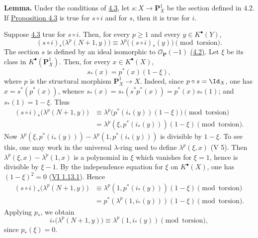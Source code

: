 \textbf{Lemma.} Under the conditions of \hyperlink{sga6.e07.thm.4-3}{4.3}, let \(s:X\to\mathbf P_X^1\) be the section defined in 4.2. If \hyperlink{sga6.e07.thm.4-3}{Proposition 4.3} is true for \(s\circ i\) and for \(s\), then it is true for \(i\).

Suppose \hyperlink{sga6.e07.thm.4-3}{4.3} true for \(s\circ i\). Then, for every \(p\ge1\) and every \(y\in K^\bullet(Y)\),
\begin{equation}\tag{4.3.3}
 (s\circ i)_*\bigl(\lambda^p(N+1,y)\bigr)
 \equiv
 \lambda^p\bigl((s\circ i)_*(y)\bigr)
 \pmod{\text{torsion}}.
\end{equation}
The section \(s\) is defined by an ideal isomorphic to \(\mathcal O_{\mathbf P}(-1)\) \hyperlink{sga6.e07.sec.4.2}{(4.2)}. Let \(\xi\) be its class in \(K^\bullet(\mathbf P_X^1)\). Then, for every \(x\in K^\bullet(X)\),
\[
  s_*(x)=p^*(x)(1-\xi),
\]
where \(p\) is the structural morphism \(\mathbf P_X^1\to X\). Indeed, since \(p\circ s=\Id_X\), one has \(x=s^*(p^*(x))\), whence \(s_*(x)=s_*(s^*p^*(x))=p^*(x)s_*(1)\); and \(s_*(1)=1-\xi\). Thus
\[
\begin{aligned}
(s\circ i)_*\bigl(\lambda^p(N+1,y)\bigr)
&\equiv \lambda^p\bigl(p^*(i_*(y))(1-\xi)\bigr)\pmod{\text{torsion}}\\
&= \lambda^p(\xi,p^*(i_*(y)))(1-\xi)\pmod{\text{torsion}}.
\end{aligned}
\]
Now \(\lambda^p(\xi,p^*(i_*(y)))-\lambda^p(1,p^*(i_*(y)))\) is divisible by \(1-\xi\). To see this, one may work in the universal \(\lambda\)-ring used to define \(\lambda^p(\xi,x)\) (V 5). Then \(\lambda^p(\xi,x)-\lambda^p(1,x)\) is a polynomial in \(\xi\) which vanishes for \(\xi=1\), hence is divisible by \(\xi-1\). By the independence equation for \(\xi\) on \(K^\bullet(X)\), one has \((1-\xi)^2=0\) (\hyperlink{sga6.e06.eq.1-13-1}{VI 1.13.1}). Hence
\[
\begin{aligned}
(s\circ i)_*\bigl(\lambda^p(N+1,y)\bigr)
&\equiv \lambda^p(1,p^*(i_*(y)))(1-\xi) \pmod{\text{torsion}}\\
&=p^*(\lambda^p(1,i_*(y)))(1-\xi) \pmod{\text{torsion}}.
\end{aligned}
\]
Applying \(p_*\), we obtain
\begin{equation}\tag{4.3.4}
  i_*\bigl(\lambda^p(N+1,y)\bigr)
  \equiv \lambda^p(1,i_*(y)) \pmod{\text{torsion}},
\end{equation}
since \(p_*(\xi)=0\).

